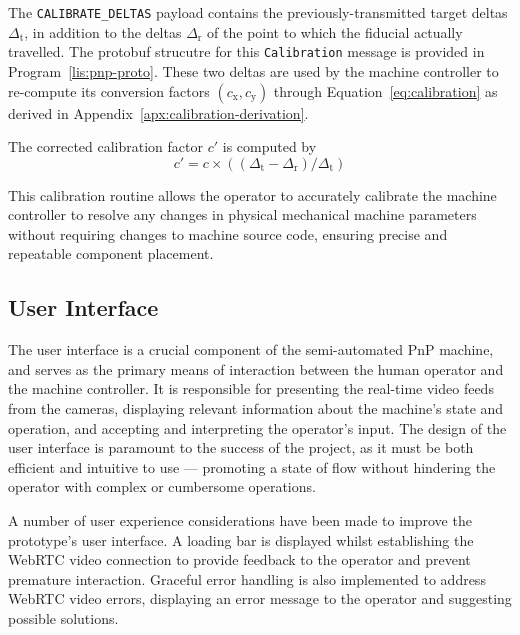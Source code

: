 \documentclass[12pt,british,UKenglish]{article}
\begin{document}
The \texttt{CALIBRATE\_DELTAS} payload contains the previously-transmitted target deltas $\Delta_\text{t}$, in addition to the deltas $\Delta_\text{r}$ of the point to which the fiducial actually travelled.
The \acl{protobuf} strucutre for this \texttt{Calibration} message is provided in Program~\ref{lis:pnp-proto}.
These two deltas are used by the machine controller to re-compute its conversion factors $(c_\text{x}, c_\text{y})$ through Equation~\eqref{eq:calibration} as derived in Appendix~\ref{apx:calibration-derivation}.

The corrected calibration factor $c'$ is computed by
\begin{equation}
    c' = c \times ((\Delta_\text{t} - \Delta_\text{r}) / \Delta_\text{t})
    \label{eq:calibration}
\end{equation}

This calibration routine allows the operator to accurately calibrate the machine controller to resolve any changes in physical mechanical machine parameters without requiring changes to machine source code, ensuring precise and repeatable component placement.


\subsection{User Interface}\label{sec:User-Interface}

The user interface is a crucial component of the semi-automated \ac{PnP} machine, and serves as the primary means of interaction between the human operator and the machine controller.
It is responsible for presenting the real-time video feeds from the cameras, displaying relevant information about the machine's state and operation, and accepting and interpreting the operator's input.
The design of the user interface is paramount to the success of the project, as it must be both efficient and intuitive to use --- promoting a state of flow without hindering the operator with complex or cumbersome operations.

A number of user experience considerations have been made to improve the prototype's user interface.
A loading bar is displayed whilst establishing the \ac{WebRTC} video connection to provide feedback to the operator and prevent premature interaction.
Graceful error handling is also implemented to address \ac{WebRTC} video errors, displaying an error message to the operator and suggesting possible solutions.
\end{document}
